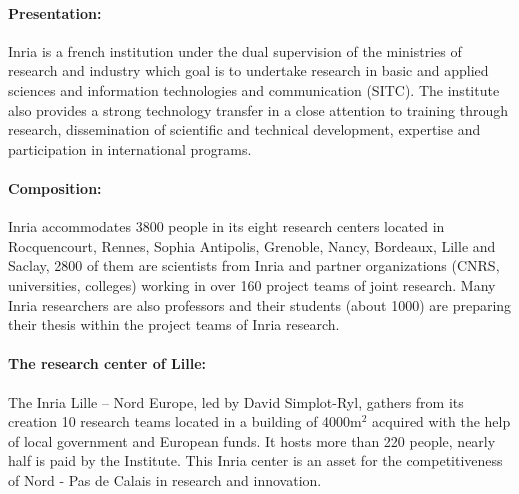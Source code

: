 \paragraph{Presentation:} Inria is a french institution under the dual supervision of the ministries of research and industry which goal is to undertake research in basic and applied sciences and information technologies and communication (SITC). The institute also provides a strong technology transfer in a close attention to training through research, dissemination of scientific and technical development, expertise and participation in international programs.

\paragraph{Composition: } Inria accommodates 3800 people in its eight research centers located in Rocquencourt, Rennes, Sophia Antipolis, Grenoble, Nancy, Bordeaux, Lille and Saclay, 2800 of them are scientists from Inria and partner organizations (CNRS, universities, colleges) working in over 160 project teams of joint research. Many Inria researchers are also professors and their students (about 1000) are preparing their thesis within the project teams of Inria research.

\paragraph{The research center of Lille: } The Inria Lille -- Nord Europe, led by David Simplot-Ryl, gathers from its creation 10 research teams located in a building of 4000m$^2$ acquired with the help of local government and European funds. It hosts more than 220 people, nearly half is paid by the Institute. This Inria  center is an asset for the competitiveness of Nord - Pas de Calais in research and innovation.
